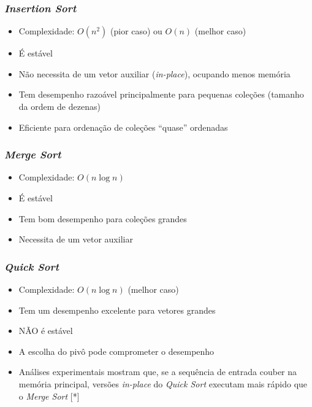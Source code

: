 \documentclass[aspectratio=169]{beamer}
\begin{document}
\begin{frame}\frametitle{\emph{Insertion Sort}}
\begin{itemize}
	\item Complexidade: $O(n^2)$ (pior caso) ou $O(n)$ (melhor caso)
	\item É estável
	\item Não necessita de um vetor auxiliar (\emph{in-place}), ocupando menos memória
	\item Tem desempenho razoável principalmente para pequenas coleções (tamanho da ordem de dezenas)
	\item Eficiente para ordenação de coleções ``quase'' ordenadas
\end{itemize}
\end{frame}

\begin{frame}\frametitle{\emph{Merge Sort}}
\begin{itemize}
	\item Complexidade: $O(n\log{n})$
	\item É estável
	\item Tem bom desempenho para coleções grandes
	\item Necessita de um vetor auxiliar
\end{itemize}
\end{frame}

\begin{frame}\frametitle{\emph{Quick Sort}}
\begin{itemize}
	\item Complexidade: $O(n\log{n})$ (melhor caso)
	\item Tem um desempenho excelente para vetores grandes
	\item NÃO é estável
	\item A escolha do pivô pode comprometer o desempenho
	\item Análises experimentais mostram que, se a sequência de entrada couber na memória principal, versões \emph{in-place} do \emph{Quick Sort}  executam mais rápido que o \emph{Merge Sort} [*]
\end{itemize}
\end{frame}
\end{document}
